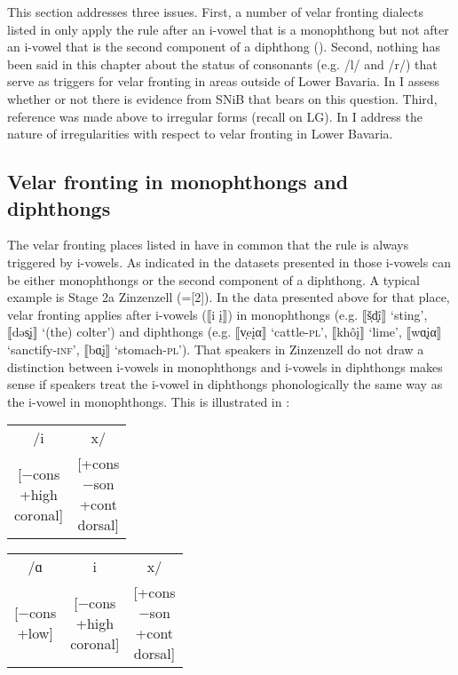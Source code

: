 This section addresses three issues. First, a number of velar fronting dialects listed in  only apply the rule after an i-vowel that is a monophthong but not after an i-vowel that is the second component of a diphthong (). Second, nothing has been said in this chapter about the status of consonants (e.g. /l/ and /r/) that serve as triggers for velar fronting in areas outside of Lower Bavaria. In  I assess whether or not there is evidence from SNiB that bears on this question. Third, reference was made above to irregular forms (recall  on LG).  In  I address the nature of irregularities with respect to velar fronting in Lower Bavaria.

\subsection{Velar fronting in monophthongs and diphthongs}\label{sec:13.5.1}

The velar fronting places listed in  have in common that the rule is always triggered by i-vowels. As indicated in the datasets presented in  those i-vowels can be either monophthongs or the second component of a diphthong. A typical example is Stage 2a Zinzenzell (=[2]). In the data presented above for that place, velar fronting applies after i-vowels (⟦i \k{i}⟧) in monophthongs (e.g. ⟦š̩d͈î⟧ ‘sting’, ⟦dəs͈\k{i}⟧ ‘(the) colter’) and diphthongs (e.g. ⟦v̩e\k{i}α⟧ ‘cattle-\textsc{pl}’, ⟦khô\k{i}⟧ ‘lime’, ⟦wɑ̣\k{i}α⟧ ‘sanctify-\textsc{inf}’, ⟦bɑ̣\k{i}⟧ ‘stomach-\textsc{pl}’). That speakers in Zinzenzell do not draw a distinction between i-vowels in monophthongs and i-vowels in diphthongs makes sense if speakers treat the i-vowel in diphthongs phonologically the same way as the i-vowel in monophthongs. This is illustrated in :

\ea%
\label{ex:13:15}
\ea\label{ex:13:15a}\begin{tabular}[t]{@{}cc@{}}
       /i        &       x/\\
       \avm{[−cons\\+high\\coronal]} & \avm{[+cons\\−son\\+cont\\dorsal]}
     \end{tabular}
\ex\label{ex:13:15b}\begin{tabular}[t]{@{}ccc@{}}
       /ɑ        &     i      &         x/\\
       \avm{[−cons\\+low]} & \avm{[−cons\\+high\\coronal]} & \avm{[+cons\\−son\\+cont\\dorsal]}
     \end{tabular}
\z 
\z 

